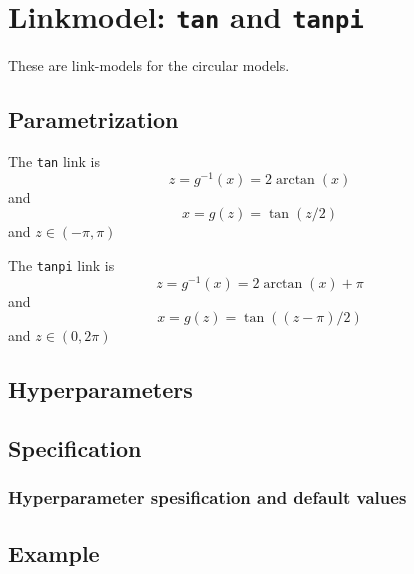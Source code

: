 \documentclass[a4paper,11pt]{article}
\begin{document}
\section*{Linkmodel: \texttt{tan} and \texttt{tanpi}}

These are link-models for the circular models. 

\subsection*{Parametrization}
The \texttt{tan} link is
\begin{displaymath}
    z = g^{-1}(x) =2\arctan(x)
\end{displaymath}
and
\begin{displaymath}
    x = g(z) = \tan(z/2)
\end{displaymath}
and $z\in(-\pi,\pi)$

The \texttt{tanpi} link is
\begin{displaymath}
    z = g^{-1}(x) =2\arctan(x) + \pi
\end{displaymath}
and
\begin{displaymath}
    x = g(z) = \tan((z-\pi)/2)
\end{displaymath}
and $z\in(0,2\pi)$


\subsection*{Hyperparameters}

\subsection*{Specification}

\subsubsection*{Hyperparameter spesification and default values}

\subsection*{Example}
\end{document}
